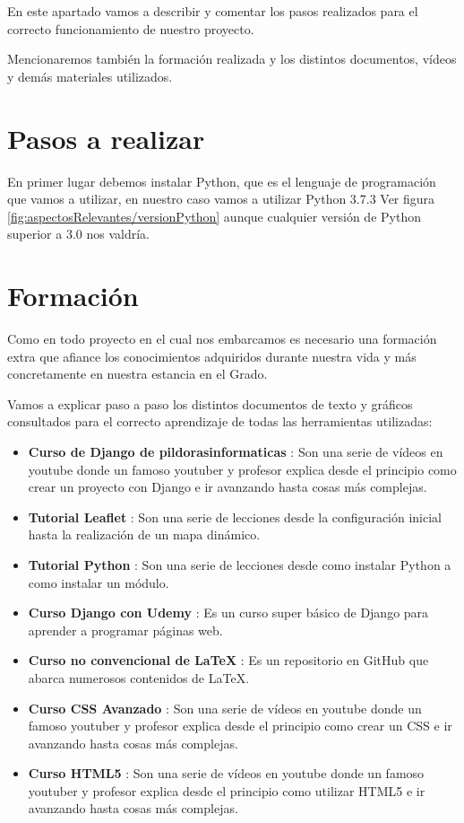 

En este apartado vamos a describir y comentar los pasos realizados para el correcto funcionamiento de nuestro proyecto.

Mencionaremos también la formación realizada y los distintos documentos, vídeos y demás materiales utilizados.


\section{Pasos a realizar}

En primer lugar debemos instalar Python, que es el lenguaje de programación que vamos a utilizar, en nuestro caso vamos a utilizar Python 3.7.3 Ver figura \ref{fig:aspectosRelevantes/versionPython} aunque cualquier versión de Python superior a 3.0 nos valdría.


\section{Formación}

Como en todo proyecto en el cual nos embarcamos es necesario una formación extra que afiance los conocimientos adquiridos durante nuestra vida y más concretamente en nuestra estancia en el Grado.

Vamos a explicar paso a paso los distintos documentos de texto y gráficos consultados para el correcto aprendizaje de todas las herramientas utilizadas:

\begin{itemize}
	\item \textbf{Curso de Django de pildorasinformaticas} \cite{djangoPildoras}: Son una serie de vídeos en youtube donde un famoso youtuber y profesor explica desde el principio como crear un proyecto con Django e ir avanzando hasta cosas más complejas.
	\item \textbf{Tutorial Leaflet} \cite{tutorialLeaflet}: Son una serie de lecciones desde la configuración inicial hasta la realización de un mapa dinámico. 
	\item \textbf{Tutorial Python} \cite{tutorialPython}: Son una serie de lecciones desde como instalar Python a como instalar un módulo. 
	\item \textbf{Curso Django con Udemy} \cite{udemy}: Es un curso super básico de Django para aprender a programar páginas web.
	\item \textbf{Curso no convencional de LaTeX} \cite{cursoLatex}: Es un repositorio en GitHub que abarca numerosos contenidos de LaTeX. 
	\item \textbf{Curso CSS Avanzado} \cite{cursoCss}: Son una serie de vídeos en youtube donde un famoso youtuber y profesor explica desde el principio como crear un CSS e ir avanzando hasta cosas más complejas.
	\item \textbf{Curso HTML5} \cite{cursoHTML}: Son una serie de vídeos en youtube donde un famoso youtuber y profesor explica desde el principio como utilizar HTML5 e ir avanzando hasta cosas más complejas.
\end{itemize}